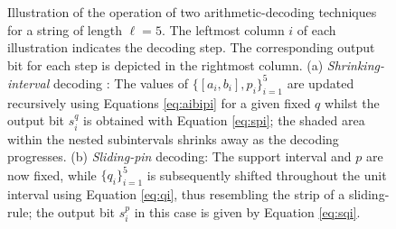\documentclass{sig-alternate}
\begin{document}
\begin{figure}[H]
	\centering
	\caption{Illustration of the operation of two arithmetic-decoding techniques for a string of length $\ell=5$. The leftmost column $i$ of each illustration indicates the decoding step. The corresponding output bit for each step is depicted in  the rightmost column. (a) \emph{Shrinking-interval} decoding \cite{Said04}: The values of $\{[a_i,b_i],p_i\}_{i=1}^{5}$ are updated recursively using Equations \eqref{eq:aibipi} for a given fixed $q$ whilst the output bit $s^q_i$ is obtained with Equation \eqref{eq:spi}; the shaded area within the nested subintervals shrinks away as the decoding progresses. (b) \emph{Sliding-pin} decoding: The support interval and $p$ are now fixed, while $\{q_i\}_{i=1}^{5}$ is subsequently shifted throughout the unit interval using Equation \eqref{eq:qi}, thus resembling the strip of a sliding-rule; the output bit $s^p_i$ in this case is given by Equation \eqref{eq:sqi}.}
	\label{fig:ac}
\end{figure}
\end{document}

